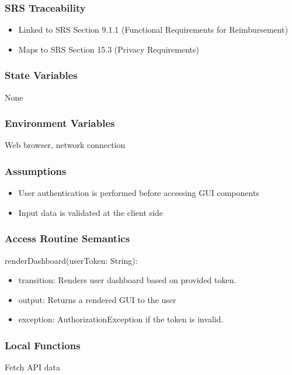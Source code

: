 \documentclass[12pt, titlepage]{article}
\begin{document}
\subsubsection{SRS Traceability}
\begin{itemize}
  \item Linked to SRS Section 9.1.1 (Functional Requirements for Reimbursement)
  \item Maps to SRS Section 15.3 (Privacy Requirements)
\end{itemize}

\subsubsection{State Variables}
None

\subsubsection{Environment Variables}
Web browser, network connection

\subsubsection{Assumptions}
\begin{itemize}
  \item User authentication is performed before accessing GUI components
  \item Input data is validated at the client side
\end{itemize}

\subsubsection{Access Routine Semantics}

\noindent renderDashboard(userToken: String):
\begin{itemize}
  \item transition: Renders user dashboard based on provided token.
  \item output: Returns a rendered GUI to the user
  \item exception: AuthorizationException if the token is invalid.
\end{itemize}

\subsubsection{Local Functions}
Fetch API data
\end{document}
